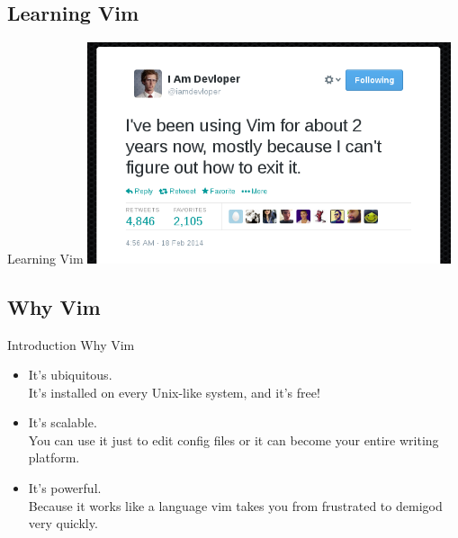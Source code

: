 \documentclass{beamer}
\begin{document}
\subsection{Learning Vim}
\begin{frame}[t]{Learning Vim}
    \centering
    \includegraphics[width=0.8\textwidth]{learningVim}
\end{frame}

\subsection{Why Vim}
\begin{frame} {Introduction} {Why Vim}
    \begin{itemize}
        \item It's ubiquitous. \\It's installed on every Unix-like system, and it's free!\\
        \item It's scalable. \\You can use it just to edit config files or it can become your entire writing platform. \\
        \item It's powerful. \\Because it works like a language vim takes you from frustrated to demigod very quickly. \\
    \end{itemize}
\end{frame}
\end{document}
